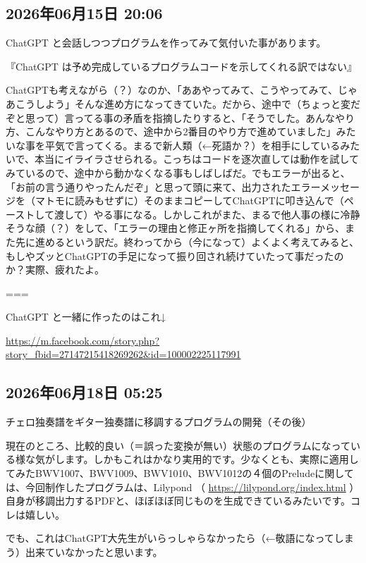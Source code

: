 \subsection*{2026年06月15日 20:06}

ChatGPT と会話しつつプログラムを作ってみて気付いた事があります。

『ChatGPT は予め完成しているプログラムコードを示してくれる訳ではない』

ChatGPTも考えながら（？）なのか、「ああやってみて、こうやってみて、じゃあこうしよう」そんな進め方になってきていた。だから、途中で（ちょっと変だぞと思って）言ってる事の矛盾を指摘したりすると、「そうでした。あんなやり方、こんなやり方とあるので、途中から2番目のやり方で進めていました」みたいな事を平気で言ってくる。まるで新人類（←死語か？）を相手にしているみたいで、本当にイライラさせられる。こっちはコードを逐次直しては動作を試してみているので、途中から動かなくなる事もしばしばだ。でもエラーが出ると、「お前の言う通りやったんだぞ」と思って頭に来て、出力されたエラーメッセージを（マトモに読みもせずに）そのままコピーしてChatGPTに叩き込んで（ペーストして渡して）やる事になる。しかしこれがまた、まるで他人事の様に冷静そうな顔（？）をして、「エラーの理由と修正ヶ所を指摘してくれる」から、また先に進めるという訳だ。終わってから（今になって）よくよく考えてみると、もしやズッとChatGPTの手足になって振り回され続けていたって事だったのか？実際、疲れたよ。

===

ChatGPT と一緒に作ったのはこれ↓

\url{https://m.facebook.com/story.php?story_fbid=27147215418269262&id=100002225117991}

\subsection*{2026年06月18日 05:25}

チェロ独奏譜をギター独奏譜に移調するプログラムの開発（その後）

現在のところ、比較的良い（＝誤った変換が無い）状態のプログラムになっている様な気がします。しかもこれはかなり実用的です。少なくとも、実際に適用してみたBWV1007、BWV1009、BWV1010、BWV1012の４個のPreludeに関しては、今回制作したプログラムは、Lilypond （ \url{https://lilypond.org/index.html} ）自身が移調出力するPDFと、ほぼほぼ同じものを生成できているみたいです。コレは嬉しい。

でも、これはChatGPT大先生がいらっしゃらなかったら（←敬語になってしまう）出来ていなかったと思います。

